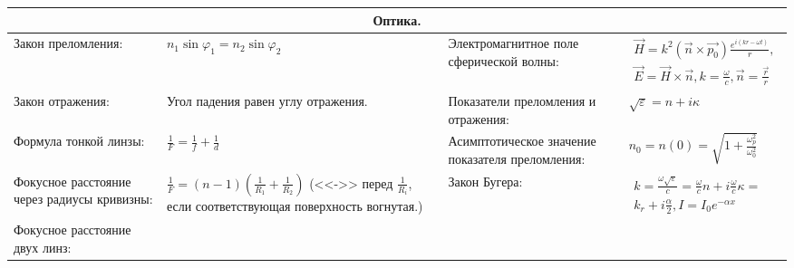 \documentclass{article}
\begin{document}
\begin{tabular}{ |p{4.1cm}|p{5.4cm}|p{3.9cm}|p{5.6cm}|  }
\hline
\multicolumn{4}{|c|}{Оптика.} \\
\hline
Закон преломления:                                                           &  %
$n_1 \sin{\varphi_1} = n_2 \sin{\varphi_2}$                                  &  %
Электромагнитное поле сферической волны:                                     &  %
$\begin{aligned}
\vec{H} = k^2 (\vec{n} \times \vec{p_0}) \frac{e^{i(kr - \omega t)}}{r}, \\
\vec{E} = \vec{H} \times \vec{n}, k = \frac{\omega}{c},
\vec{n} = \frac{\vec{r}}{r}
\end{aligned}$                 
\vspace{5pt}                                                                 \\ %
\hline
Закон отражения:                                                             &  %
Угол падения равен углу отражения.                                           &  %
Показатели преломления и отражения:                                          &  %
$\sqrt{\varepsilon} = n + i\kappa$                                           \\ %
\hline
Формула тонкой линзы:                                                        &  %
$\frac{1}{F} = \frac{1}{f} + \frac{1}{d}$                                    &  %
Асимптотическое значение показателя преломления:                             &  %
$n_0 = n(0) = \sqrt{1 + \frac{\omega_p^2}{\omega_0^2}}$                      \\ %
\hline
Фокусное расстояние через радиусы кривизны:                                  &  %
$\frac{1}{F} = (n-1)\left(\frac{1}{R_1} + \frac{1}{R_2}\right)$ (<<->> перед
$\frac{1}{R_i}$, если соответствующая поверхность вогнутая.)                 &  %
Закон Бугера:                                                                &  %
$\begin{aligned}
k = \frac{\omega \sqrt{\varepsilon}}{c} =
 \frac{\omega}{c}n + i \frac{\omega}{c} \kappa =    \\
 k_r + i \frac{\alpha}{2},
I = I_0 e^{-\alpha x}
\end{aligned}$                                                               \\ %
\hline
Фокусное расстояние двух линз:                                               &  %

\end{tabular}
\end{document}
